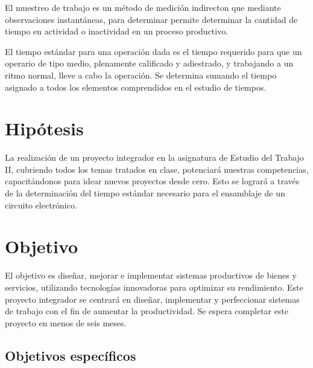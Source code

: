    El muestreo de trabajo es un método de medición indirecton que mediante observaciones instantáneas, para determinar permite determinar la cantidad de tiempo en actividad o inactividad en un proceso productivo.
    
    El tiempo estándar para una operación dada es el tiempo requerido para que un operario de tipo medio, plenamente calificado y adiestrado, y trabajando a un ritmo normal, lleve a cabo la operación. Se determina sumando el tiempo asignado a todos los elementos comprendidos en el estudio de tiempos. 
    \section{Hipótesis}
    La realización de un proyecto integrador en la asignatura de Estudio del Trabajo II, cubriendo todos los temas tratados en clase, potenciará nuestras competencias, capacitándonos para idear nuevos proyectos desde cero. Esto se logrará a través de la determinación del tiempo estándar necesario para el ensamblaje de un circuito electrónico.
    \section{Objetivo}
    El objetivo es diseñar, mejorar e implementar sistemas productivos de bienes y servicios, utilizando tecnologías innovadoras para optimizar su rendimiento. Este proyecto integrador se centrará en diseñar, implementar y perfeccionar sistemas de trabajo con el fin de aumentar la productividad. Se espera completar este proyecto en menos de seis meses.
    \subsection{Objetivos específicos }
    
    
